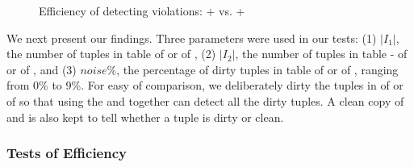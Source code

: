 \begin{figure}[tb!]
  \quad
  \quad
  \caption{Efficiency of detecting violations: \pCFDs + \pCINDs vs. \CFDs + \CINDs}\label{fig_exp1_both}
  \vspace{-3ex}
\end{figure}

We next present our findings.
%
Three parameters were used in our tests:
(1) $|I_1|$, the number of tuples in table  of \hosp or  of \dblp,
(2) $|I_2|$, the number of tuples in table - of \hosp or  of \dblp, and
(3) $noise\%$, the percentage of dirty tuples in table  of \hosp or   of \dblp, ranging from 0\% to 9\%.
For easy of comparison, we deliberately dirty the tuples in  of \hosp or   of \dblp so that using the \pCFDs and \pCINDs together can detect all the dirty tuples. A clean copy of \hosp and \dblp is also kept to tell whether a tuple is dirty or clean.


\vspace{-1ex}
\subsubsection{Tests of Efficiency}


